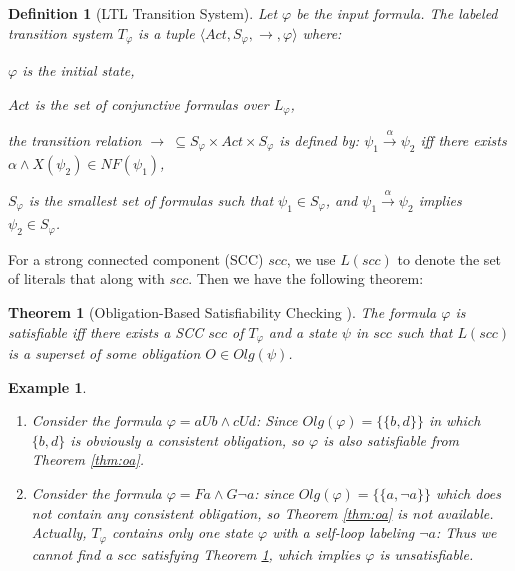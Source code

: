 \documentclass[conference]{IEEEtran}
\newtheorem{definition}{Definition}
\newtheorem{theorem}{Theorem}
\newtheorem{example}{Example}
\def\olg#1{\mathit{Olg}(#1)}
\def\phi{\varphi}
\newcommand{\tran}[1]{\xrightarrow[]{#1}}
\def\expand{\mathit{NF}}
\begin{document}
\begin{definition}[LTL Transition System]\label{def:lts}
  Let $\phi$ be the input formula. The
  labeled transition system $T_{\phi}$ is a tuple $\langle Act,
  S_\phi, \tran{}, \phi\rangle$ where: 
  
  \iffalse
  1). $\phi$ is the initial state; 
  2). $Act$ is the set of conjunctive formulas over $L_{\phi}$; 
  3). the transition relation $\tran{}\ \subseteq S_\phi\times Act\times S_\phi$ is defined by:
    $\psi_1\tran{\alpha}\psi_2$ iff there exists $\alpha\wedge
    X(\psi_2) \in \expand(\psi_1)$; and 4). $S_\phi$ is the smallest set of formulas such that $\psi_1\in
  S_\phi$, and $\psi_1\tran{\alpha}\psi_2$ implies
  $\psi_2\in S_\phi$.
  \fi
  \begin{compactenum}
  \item  $\phi$ is the initial state, 
  \item $Act$ is the set of conjunctive formulas over $L_{\phi}$,
 \item the transition relation $\tran{}\ \subseteq S_\phi\times Act\times S_\phi$ is defined by:
    $\psi_1\tran{\alpha}\psi_2$ iff there exists $\alpha\wedge
    X(\psi_2) \in \expand(\psi_1)$,
\item $S_\phi$ is the smallest set of formulas such that $\psi_1\in
  S_\phi$, and $\psi_1\tran{\alpha}\psi_2$ implies
  $\psi_2\in S_\phi$.
  \end{compactenum}
\end{definition}

For a strong connected component (SCC) $scc$, we use $L(scc)$ to denote the set of literals that along with $scc$. 
Then we have the following theorem:

\begin{theorem}[Obligation-Based Satisfiability Checking \cite{LZPVH13}]\label{thm:scc}
  The formula $\phi$ is satisfiable iff there exists a SCC
  $scc$ of $T_\phi$ and a state $\psi$ in $scc$ such that $L(scc)$ is a
  superset of some obligation $O\in \olg{\psi}$.
\end{theorem}

\begin{example}
  \begin{enumerate}
    \item Consider the formula $\phi=a U b \wedge c U d$: Since $\olg{\phi}=\{\{b, d\}\}$  in 
    which $\{b,d\}$ is 
    obviously a consistent obligation, so $\phi$ is also satisfiable from Theorem \ref{thm:oa}.
    \item Consider the formula $\phi=F a \wedge G\neg a$: since 
    $\olg{\phi}=\{\{a,\neg a\}\}$ which does not contain any consistent obligation, so Theorem 
    \ref{thm:oa} is not available. Actually, $T_\phi$ contains only one state $\phi$ with a 
    self-loop labeling $\neg a$: Thus we cannot find a $scc$ satisfying Theorem \ref{thm:scc}, 
    which implies $\phi$ is unsatisfiable. 
  \end{enumerate}
\end{example}
\end{document}
